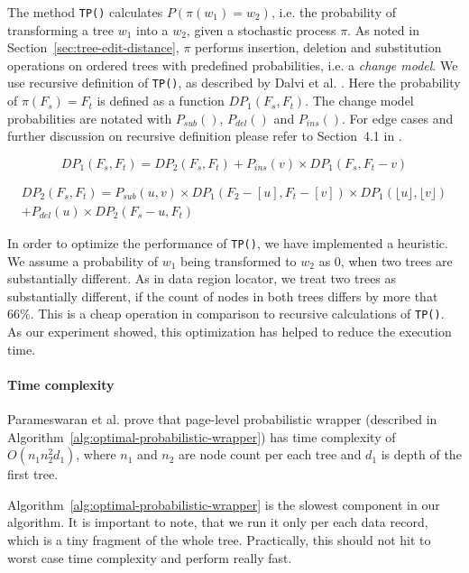 The method \texttt{TP()} calculates $P(\pi(w_1) = w_2)$, i.e. the probability of transforming a tree $w_1$ into a $w_2$, given a stochastic process $\pi$. As noted in Section~\ref{sec:tree-edit-distance}, $\pi$ performs insertion, deletion and substitution operations on ordered trees with predefined probabilities, i.e. a \emph{change model}. We use recursive definition of \texttt{TP()}, as described by Dalvi et al. \cite{dalvi2009a}. Here the probability of $\pi(F_s) = F_t$ is defined as a function $DP_1(F_s, F_t)$. The change model probabilities are notated with $P_{sub}()$, $P_{del}()$ and $P_{ins}()$. For edge cases and further discussion on recursive definition please refer to Section~4.1 in \cite{dalvi2009a}. 

\begin{equation}
	DP_1(F_s, F_t) = DP_2(F_s, F_t) + P_{ins}(v) \times DP_1(F_s, F_t - v)
\end{equation}

\begin{equation}
	\begin{split}
		DP_2(F_s, F_t) = P_{sub}(u, v) \times DP_1(F_2 - [u], F_t - [v]) \times DP_1(\lfloor u \rfloor, \lfloor v \rfloor) \\
		+ P_{del}(u) \times DP_2(F_s - u, F_t)
	\end{split}
\end{equation}

In order to optimize the performance of \texttt{TP()}, we have implemented a heuristic. We assume a probability of $w_1$ being transformed to $w_2$ as $0$, when two trees are substantially different. As in data region locator, we treat two trees as substantially different, if the count of nodes in both trees differs by more that $66\%$. This is a cheap operation in comparison to recursive calculations of \texttt{TP()}. As our experiment showed, this optimization has helped to reduce the execution time.

\paragraph{Time complexity} Parameswaran et al. \cite{DBLP:journals/pvldb/ParameswaranDGR11} prove that page-level probabilistic wrapper (described in Algorithm~\ref{alg:optimal-probabilistic-wrapper}) has time complexity of $O(n_1 n_2^2 d_1)$, where $n_1$ and $n_2$ are node count per each tree and $d_1$ is depth of the first tree. 

Algorithm~\ref{alg:optimal-probabilistic-wrapper} is the slowest component in our algorithm. It is important to note, that we run it only per each data record, which is a tiny fragment of the whole tree. Practically, this should not hit to worst case time complexity and perform really fast.


